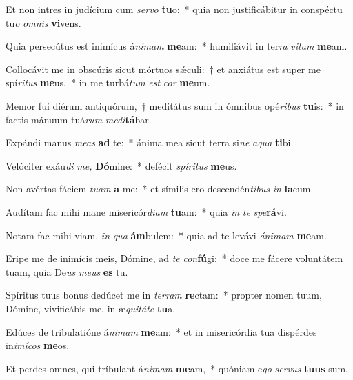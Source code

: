 \item Et non intres in judícium cum \textit{servo} \textbf{tu}o:~* quia non justificábitur in conspé\-ctu tu\tinyhspace\textit{o} \textit{omnis} \textbf{vi}vens.
\item Quia persecútus est inimícus á\tinyhspace\textit{nimam} \textbf{me}am:~* humiliávit in ter\textit{ra} \textit{vitam} \textbf{me}am.
\item Collocávit me in obscúris sicut mórtuos sǽculi:~† et anxiátus est super me spí\tinyhspace\textit{ritus} \textbf{me}us,~* in me turbá\tinyhspace\textit{tum} \textit{est} \textit{cor} \textbf{me}um.
\item Memor fui diérum antiquórum,~† meditátus sum in ómnibus opé\tinyhspace\textit{ribus} \textbf{tu}is:~* in factis mánuum tuá\tinyhspace\textit{rum} \textit{medi}\textbf{tá}bar.
\item Expándi manus \textit{meas} \textbf{ad} te:~* ánima mea sicut terra si\tinyhspace\textit{ne} \textit{aqua} \textbf{ti}bi.
\item Velóciter exáu\textit{di} \textit{me,} \textbf{Dó}mine:~* defécit \textit{spíritus} \textbf{me}us.
\item Non avértas fáciem \textit{tuam} \textbf{a} me:~* et símilis ero descendén\textit{tibus} \textit{in} \textbf{la}cum.
\item Audítam fac mihi mane misericór\textit{diam} \textbf{tu}am:~* quia \textit{in} \textit{te} \textit{spe}\textbf{rá}vi.
\item Notam fac mihi viam, \textit{in} \textit{qua} \textbf{ám}bulem:~* quia ad te levávi \textit{ánimam} \textbf{me}am.
\item Eripe me de inimícis meis, Dómine, ad \textit{te} \textit{con}\textbf{fú}gi:~* doce me fácere voluntátem tuam, quia De\textit{us} \textit{meus} \textbf{es} tu.
\item Spíritus tuus bonus dedúcet me in \textit{terram} \textbf{re}ctam:~* pro\-pter nomen tuum, Dómine, vivificábis me, in æ\tinyhspace\textit{quitáte} \textbf{tu}a.
\item Edúces de tribulatióne á\tinyhspace\textit{nimam} \textbf{me}am:~* et in misericórdia tua dispérdes in\textit{imícos} \textbf{me}os.
\item Et perdes omnes, qui tríbulant á\textit{nimam} \textbf{me}am,~* quóniam e\textit{go} \textit{servus} \textbf{tu}\textbf{us} sum.
